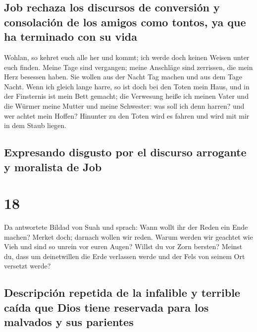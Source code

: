 \hypertarget{job-rechaza-los-discursos-de-conversiuxf3n-y-consolaciuxf3n-de-los-amigos-como-tontos-ya-que-ha-terminado-con-su-vida}{%
\subsection{Job rechaza los discursos de conversión y consolación de los
amigos como tontos, ya que ha terminado con su
vida}\label{job-rechaza-los-discursos-de-conversiuxf3n-y-consolaciuxf3n-de-los-amigos-como-tontos-ya-que-ha-terminado-con-su-vida}}

 Wohlan, so kehret euch alle her und kommt; ich werde
doch keinen Weisen unter euch finden.  Meine Tage sind
vergangen; meine Anschläge sind zerrissen, die mein Herz besessen haben.
 Sie wollen aus der Nacht Tag machen und aus dem Tage
Nacht.  Wenn ich gleich lange harre, so ist doch bei den
Toten mein Haus, und in der Finsternis ist mein Bett gemacht;
 die Verwesung heiße ich meinen Vater und die Würmer
meine Mutter und meine Schwester:  was soll ich denn
harren? und wer achtet mein Hoffen?  Hinunter zu den
Toten wird es fahren und wird mit mir in dem Staub liegen.

\hypertarget{expresando-disgusto-por-el-discurso-arrogante-y-moralista-de-job}{%
\subsection{Expresando disgusto por el discurso arrogante y moralista de
Job}\label{expresando-disgusto-por-el-discurso-arrogante-y-moralista-de-job}}

\hypertarget{section-17}{%
\section{18}\label{section-17}}

 Da antwortete Bildad von Suah und sprach: 
Wann wollt ihr der Reden ein Ende machen? Merket doch; darnach wollen
wir reden.  Warum werden wir geachtet wie Vieh und sind so
unrein vor euren Augen?  Willst du vor Zorn bersten?
Meinst du, dass um deinetwillen die Erde verlassen werde und der Fels
von seinem Ort versetzt werde?

\hypertarget{descripciuxf3n-repetida-de-la-infalible-y-terrible-cauxedda-que-dios-tiene-reservada-para-los-malvados-y-sus-parientes}{%
\subsection{Descripción repetida de la infalible y terrible caída que
Dios tiene reservada para los malvados y sus
parientes}\label{descripciuxf3n-repetida-de-la-infalible-y-terrible-cauxedda-que-dios-tiene-reservada-para-los-malvados-y-sus-parientes}}

